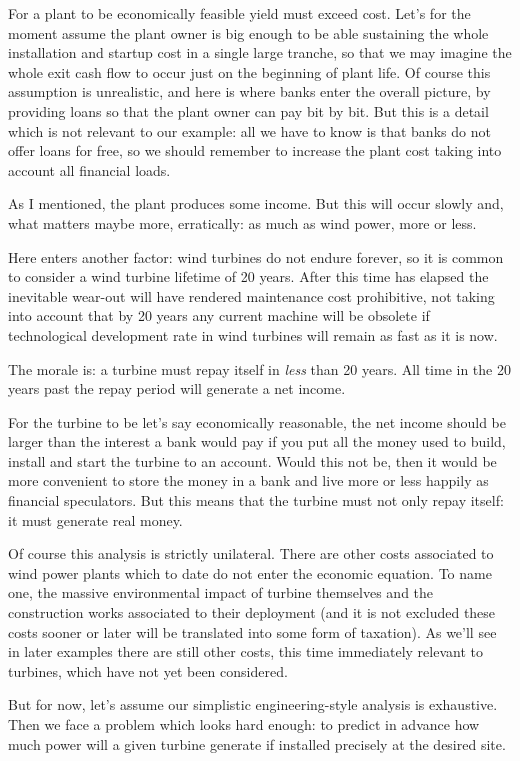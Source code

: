 \documentclass[a4paper,10pt]{book}
\begin{document}
For a plant to be economically feasible yield must exceed cost. Let's for the moment assume the plant owner is big enough to be able sustaining the whole installation and startup cost in a single large tranche, so that we may imagine the whole exit cash flow to occur just on the beginning of plant life. Of course this assumption is unrealistic, and here is where banks enter the overall picture, by providing loans so that the plant owner can pay bit by bit. But this is a detail which is not relevant to our example: all we have to know is that banks do not offer loans for free, so we should remember to increase the plant cost taking into account all financial loads.

As I mentioned, the plant produces some income. But this will occur slowly and, what matters maybe more, erratically: as much as wind power, more or less.

Here enters another factor: wind turbines do not endure forever, so it is common to consider a wind turbine lifetime of 20 years. After this time has elapsed the inevitable wear-out will have rendered maintenance cost prohibitive, not taking into account that by 20 years any current machine will be obsolete if technological development rate in wind turbines will remain as fast as it is now.

The morale is: a turbine must repay itself in \emph{less} than 20 years. All time in the 20 years past the repay period will generate a net income.

For the turbine to be let's say economically reasonable, the net income should be larger than the interest a bank would pay if you put all the money used to build, install and start the turbine to an account. Would this not be, then it would be more convenient to store the money in a bank and live more or less happily as financial speculators. But this means that the turbine must not only repay itself: it must generate real money.

Of course this analysis is strictly unilateral. There are other costs associated to wind power plants which to date do not enter the economic equation. To name one, the massive environmental impact of turbine themselves and the construction works associated to their deployment (and it is not excluded these costs sooner or later will be translated into some form of taxation). As we'll see in later examples there are still other costs, this time immediately relevant to turbines, which have not yet been considered.

But for now, let's assume our simplistic engineering-style analysis is exhaustive. Then we face a problem which looks hard enough: to predict in advance how much power will a given turbine generate if installed precisely at the desired site.
\end{document}
